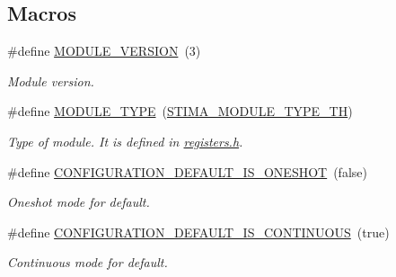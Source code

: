 \subsection*{Macros}
\begin{DoxyCompactItemize}
\item 
\mbox{\label{i2c-th-config_8h_aa8639a8d4e83d9cc4187d7a751228464}} 
\#define \hyperlink{i2c-th-config_8h_aa8639a8d4e83d9cc4187d7a751228464}{M\+O\+D\+U\+L\+E\+\_\+\+V\+E\+R\+S\+I\+ON}~(3)
\begin{DoxyCompactList}\small\item\em Module version. \end{DoxyCompactList}\item 
\mbox{\label{i2c-th-config_8h_a8c815d03b3fd3e18ca06f920a1eb4e8e}} 
\#define \hyperlink{i2c-th-config_8h_a8c815d03b3fd3e18ca06f920a1eb4e8e}{M\+O\+D\+U\+L\+E\+\_\+\+T\+Y\+PE}~(\hyperlink{stima__module_8h_ab4d075291417ea1254b52a2db807c89d}{S\+T\+I\+M\+A\+\_\+\+M\+O\+D\+U\+L\+E\+\_\+\+T\+Y\+P\+E\+\_\+\+TH})
\begin{DoxyCompactList}\small\item\em Type of module. It is defined in \hyperlink{registers_8h}{registers.\+h}. \end{DoxyCompactList}\item 
\mbox{\label{i2c-th-config_8h_a5c4024778a87026713c77babd50c06e8}} 
\#define \hyperlink{i2c-th-config_8h_a5c4024778a87026713c77babd50c06e8}{C\+O\+N\+F\+I\+G\+U\+R\+A\+T\+I\+O\+N\+\_\+\+D\+E\+F\+A\+U\+L\+T\+\_\+\+I\+S\+\_\+\+O\+N\+E\+S\+H\+OT}~(false)
\begin{DoxyCompactList}\small\item\em Oneshot mode for default. \end{DoxyCompactList}\item 
\mbox{\label{i2c-th-config_8h_a21819dc42c8c71731e30c99bcf8b0f76}} 
\#define \hyperlink{i2c-th-config_8h_a21819dc42c8c71731e30c99bcf8b0f76}{C\+O\+N\+F\+I\+G\+U\+R\+A\+T\+I\+O\+N\+\_\+\+D\+E\+F\+A\+U\+L\+T\+\_\+\+I\+S\+\_\+\+C\+O\+N\+T\+I\+N\+U\+O\+US}~(true)
\begin{DoxyCompactList}\small\item\em Continuous mode for default. \end{DoxyCompactList}\item 
\mbox{\label{i2c-th-config_8h_a25fb304ef264a84353f1d4cfc61128e9}} 

\end{DoxyCompactItemize}
